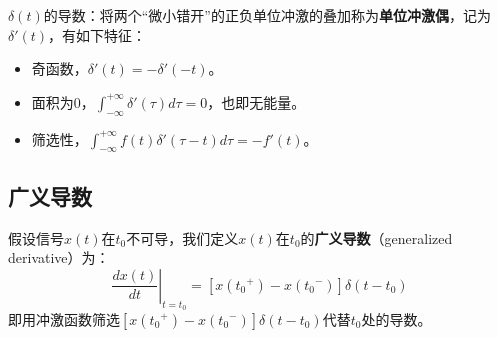 $\delta \left( t \right) $的导数：将两个“微小错开”的正负单位冲激的叠加称为{\bf 单位冲激偶}，记为$\delta '\left( t \right) $，有如下特征：
\begin{itemize}
    \item 奇函数，$\delta '\left( t \right) =-\delta '\left( -t \right) $。
    \item 面积为0，$\int_{-\infty}^{+\infty}{\delta '\left( \tau \right) d\tau}=0$，也即无能量。
    \item 筛选性，$\int_{-\infty}^{+\infty}{f\left( t \right) \delta '\left( \tau -t \right) d\tau}=-f'\left( t \right) $。
\end{itemize}

\subsection{广义导数}

\begin{definition}[广义导数]
假设信号$x\left( t \right) $在$t_0$不可导，我们定义$x\left( t \right) $在$t_0$的{\bf 广义导数}（generalized derivative）为：
\[
\left. \frac{dx\left( t \right)}{dt} \right|_{t=t_0}=\left[ x\left( {t_0}^+ \right) -x\left( {t_0}^- \right) \right] \delta \left( t-t_0 \right)
\]
即用冲激函数筛选$\left[ x\left( {t_0}^+ \right) -x\left( {t_0}^- \right) \right] \delta \left( t-t_0 \right) $代替$t_0$处的导数。
\end{definition}




